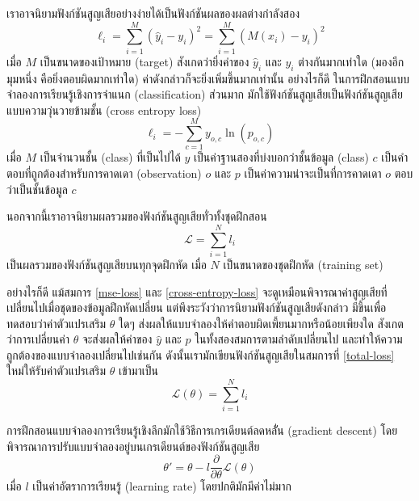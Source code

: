 \documentclass{cpepaper}
\begin{document}
เราอาจนิยามฟังก์ชันสูญเสียอย่างง่ายได้เป็นฟังก์ชันผลของผลต่างกำลังสอง
\begin{equation}
    \ell_i = \sum_{i=1}^{M}{(\hat{y}_i - y_i)^2} = \sum_{i=1}^{M}{(M(x_i) - y_i)^2}
    \label{mse-loss}
\end{equation}
เมื่อ $M$ เป็นขนาดของเป้าหมาย (target) สังเกดว่ายิ่งค่าของ $\hat{y}_i$ และ $y_i$ ต่างกันมากเท่าใด (มองอีกมุมหนึ่ง คือยิ่งตอบผิดมากเท่าใด) ค่าดังกล่าวก็จะยิ่งเพิ่มขึ้นมากเท่านั้น อย่างไรก็ดี ในการฝึกสอนแบบจำลองการเรียนรู้เชิงการจำแนก (classification) ส่วนมาก มักใช้ฟังก์ชันสูญเสียเป็นฟังก์ชันสูญเสียแบบความวุ่นวายข้ามชั้น (cross entropy loss)
\begin{equation}
    \ell_i = -\sum_{c=1}^{M}y_{o,c}\ln(p_{o,c})
    \label{cross-entropy-loss}
\end{equation}
เมื่อ $M$ เป็นจำนวนชั้น (class) ที่เป็นไปได้ $y$ เป็นค่าฐานสองที่บ่งบอกว่าชั้นข้อมูล (class) $c$ เป็นคำตอบที่ถูกต้องสำหรับการคาดเดา (observation) $o$ และ $p$ เป็นค่าความน่าจะเป็นที่การคาดเดา $o$ ตอบว่าเป็นชั้นข้อมูล $c$

นอกจากนี้เราอาจนิยามผลรวมของฟังก์ชันสูญเสียทั่วทั้งชุดฝึกสอน
\begin{equation}
    \mathcal{L} = \sum_{i=1}^{N}{l_i}
    \label{total-loss}
\end{equation}
เป็นผลรวมของฟังก์ชันสูญเสียบนทุกจุดฝึกหัด เมื่อ $N$ เป็นขนาดของชุดฝึกหัด (training set)

อย่างไรก็ดี แม้สมการ \ref{mse-loss} และ \ref{cross-entropy-loss} จะดูเหมือนพิจารณาค่าสูญเสียที่เปลี่ยนไปเมื่อชุดของข้อมูลฝึกหัดเปลี่ยน แต่พึงระวังว่าการนิยามฟังก์ชันสูญเสียดังกล่าว มีขึ้นเพื่อทดสอบว่าค่าตัวแปรเสริม $\theta$ ใดๆ ส่งผลให้แบบจำลองให้คำตอบผิดเพี้ยนมากหรือน้อยเพียงใด สังเกตว่าการเปลี่ยนค่า $\theta$ จะส่งผลให้ค่าของ $\hat{y}$ และ $p$ ในทั้งสองสมการตามลำดับเปลี่ยนไป และทำให้ความถูกต้องของแบบจำลองเปลี่ยนไปเช่นกัน ดังนั้นเรามักเขียนฟังก์ชันสูญเสียในสมการที่ \ref{total-loss} ใหม่ให้รับค่าตัวแปรเสริม $\theta$ เข้ามาเป็น
\begin{equation}
    \mathcal{L}(\theta) = \sum_{i=1}^{N}{l_i}
    \label{total-loss-theta}
\end{equation}

การฝึกสอนแบบจำลองการเรียนรู้เชิงลึกมักใช้วิธีการเกรเดียนต์ลดหลัั่น (gradient descent) โดยพิจารณาการปรับแบบจำลองอยู่บนเกรเดียนต์ของฟังก์ชันสูญเสีย
\begin{equation}
    \theta' = \theta - l \frac{\partial}{\partial \theta}{\mathcal{L}(\theta)}
    \label{gradient-descent}
\end{equation}
เมื่อ $l$ เป็นค่าอัตราการเรียนรู้ (learning rate) โดยปกติมักมีค่าไม่มาก
\end{document}
